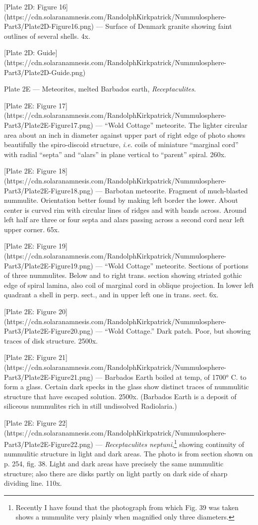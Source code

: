 \documentclass[a4paper, 12pt, oneside]{article}
\begin{document}
[Plate 2D: Figure 16](https://cdn.solaranamnesis.com/RandolphKirkpatrick/Nummulosphere-Part3/Plate2D-Figure16.png) --- Surface of Denmark granite showing faint outlines of several shells. 4x.

[Plate 2D: Guide](https://cdn.solaranamnesis.com/RandolphKirkpatrick/Nummulosphere-Part3/Plate2D-Guide.png)

Plate 2E --- Meteorites, melted Barbados earth, \emph{Receptaculites}.

[Plate 2E: Figure 17](https://cdn.solaranamnesis.com/RandolphKirkpatrick/Nummulosphere-Part3/Plate2E-Figure17.png) --- ``Wold Cottage'' meteorite. The lighter circular area about an inch in diameter against upper part of right edge of photo shows beautifully the spiro-discoid structure, \emph{i.e.} coils of miniature ``marginal cord'' with radial ``septa'' and ``alars'' in plane vertical to ``parent'' spiral. 260x.

[Plate 2E: Figure 18](https://cdn.solaranamnesis.com/RandolphKirkpatrick/Nummulosphere-Part3/Plate2E-Figure18.png) --- Barbotan meteorite. Fragment of much-blasted nummulite. Orientation better found by making left border the lower. About center is curved rim with circular lines of ridges and with bands across. Around left half are three or four septa and alars passing across a second cord near left upper corner. 65x.

[Plate 2E: Figure 19](https://cdn.solaranamnesis.com/RandolphKirkpatrick/Nummulosphere-Part3/Plate2E-Figure19.png) --- ``Wold Cottage'' meteorite. Sections of portions of three nummulites. Below and to right trans. section showing striated gothic edge of spiral lamina, also coil of marginal cord in oblique projection. In lower left quadrant a shell in perp. sect., and in upper left one in trans. sect. 6x.

[Plate 2E: Figure 20](https://cdn.solaranamnesis.com/RandolphKirkpatrick/Nummulosphere-Part3/Plate2E-Figure20.png) --- ``Wold Cottage.'' Dark patch. Poor, but showing traces of disk structure. 2500x.

[Plate 2E: Figure 21](https://cdn.solaranamnesis.com/RandolphKirkpatrick/Nummulosphere-Part3/Plate2E-Figure21.png) --- Barbados Earth boiled at temp, of 1700° C. to form a glass. Certain dark specks in the glass show distinct traces of nummulitic structure that have escaped solution. 2500x. (Barbados Earth is a deposit of siliceous nummulites rich in still undissolved Radiolaria.)

[Plate 2E: Figure 22](https://cdn.solaranamnesis.com/RandolphKirkpatrick/Nummulosphere-Part3/Plate2E-Figure22.png) --- \emph{Receptaculites neptuni},\footnote{Recently I have found that the photograph from which Fig. 39 was taken shows a nummulite very plainly when magnified only three diameters.} showing continuity of nummulitic structure in light and dark areas. The photo is from section shown on p. 254, fig. 38. Light and dark areas have precisely the same nummulitic structure; also there are disks partly on light partly on dark side of sharp dividing line. 110x.
\end{document}
